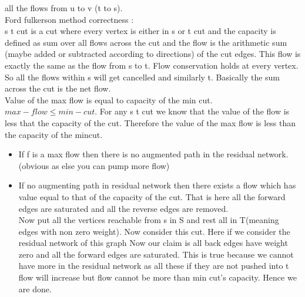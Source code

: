 \documentclass[solution,addpoints,12pt]{exam}
\begin{document}
all the flows from u to v (t to s).\\
Ford fulkerson method correctness :\\
s t cut is a cut where every vertex is either in s or t cut and the capacity is
defined as sum over all flows across the cut and the flow is the arithmetic sum
(maybe added or subtracted according to directions) of the cut edges.
This flow is exactly the same as the flow from s to t.
Flow conservation holds at every vertex. So all the flows within s will get cancelled
and similarly t. Basically the sum across the cut is the net flow.\\
Value of the max flow is equal to capacity of the min cut.
$max-flow \le min-cut$. For any s t cut we know that the value of the flow
is less that the capacity of the cut. Therefore the value of the max flow is less
than the capacity of the mincut.
\begin{itemize}
\item
If f is a max flow then there is no augmented
path in the residual network.(obvious as else you can pump more flow)
\item If no augmenting path in residual network then there exists a flow which has
value equal to that of the capacity of the cut. That is here all the forward edges are saturated
and all the reverse edges are removed.\\
Now put all the vertices reachable from s in S and rest all in T(meaning edges with non zero weight). Now consider this cut. Here if we consider the residual network of this graph
Now our claim is all back edges have weight zero and all the forward edges are saturated.
This is true because we cannot have more in the residual network as all these if they are not pushed into
t flow will increase but flow cannot be more than min cut's capacity. Hence we are done.
\end{itemize}
\end{document}
